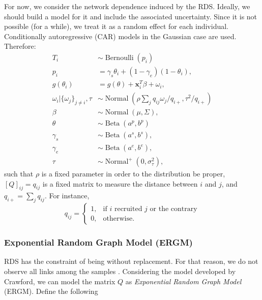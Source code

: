 \documentclass[a4paper, notitlepage, 11pt]{article}
\newcommand{\x}{\boldsymbol{x}}
\newcommand{\N}{\operatorname{Normal}}
\newcommand{\betadist}{\operatorname{Beta}}
\theoremstyle{definition}
\theoremstyle{remark}
\begin{document}
For now, we consider the network dependence induced by the RDS. Ideally, we 
should build a model for it and include the associated uncertainty.
Since it is not possible (for a while), we treat it as a random effect for
each individual. Conditionally autoregressive (CAR) models in the
Gaussian case are used. Therefore: 
\begin{equation}
  \begin{aligned}
    T_i &\sim \operatorname{Bernoulli}(p_i) \\
    p_i &= \gamma_s\theta_i + (1-\gamma_e)(1 - \theta_i),  \\
    g(\theta_i) &= g(\theta) + \x_i^T\beta + \omega_i,  \\
    \omega_i|\{\omega_j\}_{j\neq i}, \tau &\sim \N\left(\rho\sum_j q_{ij}\omega_j/q_{i+}, \tau^2/q_{i+}\right) \\
    \beta &\sim \N(\mu, \Sigma), \\ 
    \theta &\sim \betadist(a^p, b^p) \\
    \gamma_s &\sim \betadist(a^s, b^s), \\
    \gamma_e &\sim \betadist(a^e, b^e), \\  
    \tau &\sim \N^+(0,\sigma^2_{\tau}),  
  \end{aligned}  
\end{equation}
such that $\rho$ is a fixed parameter in order to the distribution be proper, $[Q]_{ij} = q_{ij}$ is a fixed matrix to measure the distance between $i$
and $j$, and $q_{i+} = \sum_{j} q_{ij}$. For instance,
$$
q_{ij} = \begin{cases}
  1, &\text{if } i \text{ recruited } j \text{ or the contrary} \\
  0, &\text{otherwise.} 
\end{cases}
$$

\subsubsection{Exponential Random Graph Model (ERGM)}

RDS has the constraint of being without replacement. For that reason, we do
not observe all links among the samples \cite[]{crawford2016}. Considering the
model developed by Crawford, we can model the
matrix $Q$ as {\em Exponential Random Graph Model} (ERGM). Define the
following 
\end{document}
